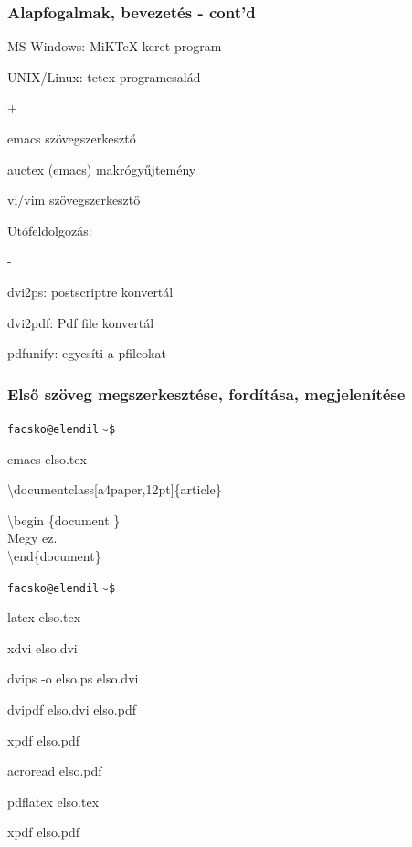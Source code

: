 \documentclass[t,aspectratio=169]{beamer}
\begin{document}

\begin{frame}
\frametitle{Alapfogalmak, bevezetés - cont'd}
\begin{itemize}
\setlength{\parskip}{0pt}
\item MS Windows: MiKTeX keret program
\item UNIX/Linux: tetex programcsalád 
\begin{list}{+}{}
\item emacs szövegszerkesztő
\item auctex (emacs) makrógyűjtemény
\item vi/vim szövegszerkesztő
\item Utófeldolgozás:
\begin{list}{-}{}
\item dvi2ps: postscriptre konvertál
\item dvi2pdf: Pdf file konvertál
\item pdfunify: egyesíti a pfileokat
\end{list}
\end{list}
\end{itemize}
\end{frame}


\begin{frame}
\frametitle{Első szöveg megszerkesztése, fordítása, megjelenítése}
\begin{list}{\texttt{facsko@elendil$\sim$\$}}{}
\setlength{\parskip}{0pt}
\setlength{\itemsep}{0pt}
\item emacs elso.tex
\end{list}

\textbackslash documentclass[a4paper,12pt]\{article\}

\textbackslash begin \{document \}\\
Megy ez.\\
\textbackslash end\{document\}

\begin{list}{\texttt{facsko@elendil$\sim$\$}}{}
\setlength{\parskip}{0pt}
\setlength{\itemsep}{0pt}
\item latex elso.tex
\item xdvi elso.dvi
\item dvips -o elso.ps elso.dvi
\item dvipdf elso.dvi elso.pdf
\item xpdf elso.pdf
\item acroread elso.pdf
\\ 
\item pdflatex elso.tex
\item xpdf elso.pdf
\end{list}
\end{frame}
\end{document}
